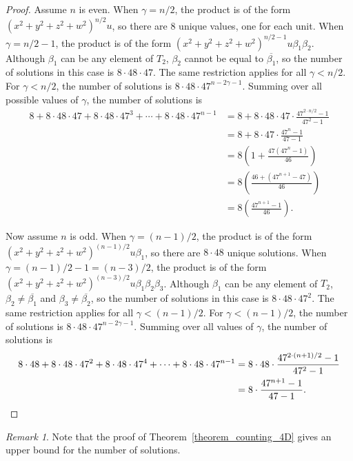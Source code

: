 \documentclass[12pt,table]{article}
\theoremstyle{definition}
\theoremstyle{remark}
\newtheorem{remark}[theorem]{Remark}
\newcommand{\myfrac}[2]{#1 / #2}
\numberwithin{equation}{section}
\begin{document}
\begin{proof}
Assume $ n $ is even.
When $ \gamma = \myfrac{n}{2} $, the product is of the form
$ (x^2 + y^2 + z^2 + w^2)^{\myfrac{n}{2}} u  $, so there are 8 unique values, one for
each unit.
When $ \gamma = \myfrac{n}{2} - 1 $, the product is of the form
$ (x^2 + y^2 + z^2 + w^2)^{\myfrac{n}{2} - 1} u \beta_1 \beta_2  $. Although $ \beta_1 $
can be any element of $ T_2 $, $ \beta_2 $ cannot be equal to $ \overline{ \beta_1 } $,
so the number of solutions in this case is $ 8 \cdot 48 \cdot 47 $. The same restriction
applies for all $ \gamma < \myfrac{n}{2} $. For $ \gamma < \myfrac{n}{2} $,
the number of
solutions is $ 8 \cdot 48 \cdot 47^{n - 2\gamma - 1} $.
Summing over all possible values of $ \gamma $, the number of solutions is
\begin{align*}
8 + 8 \cdot 48 \cdot 47 + 8 \cdot 48 \cdot 47^3 + \dotsb
+ 8 \cdot 48 \cdot 47^{n-1}
&= 8 + 8 \cdot 48 \cdot 47 \cdot \frac{47^{2 \cdot \myfrac{n}{2} } - 1 }{47^2 - 1}
\\
&= 8 + 8 \cdot 47 \cdot \frac{47^{n} - 1 }{47 - 1}
\\
&= 8 \left(1 +  \frac{47 (47^{n} - 1 ) }{46}\right)
\\
&= 8 \left( \frac{46 + (47^{n+1} - 47 ) }{46}\right)
\\
&= 8 \left( \frac{47^{n+1} -1 }{46}\right).
\end{align*}

Now assume $ n $ is odd.
When $ \gamma = \myfrac{(n-1)}{2} $, the product is of the form
$ (x^2 + y^2 + z^2 + w^2)^{\myfrac{(n-1)}{2}} u \beta_1  $, so there are $ 8 \cdot 48 $
unique solutions.
When $ \gamma = \myfrac{(n-1)}{2} - 1 = \myfrac{(n-3)}{2}  $, the product is of the form
$ (x^2 + y^2 + z^2 + w^2)^{\myfrac{(n-3)}{2}} u \beta_1 \beta_2 \beta_3  $. Although $ \beta_1 $
can be any element of $ T_2 $, $ \beta_2 \neq \overline{ \beta_1 } $
and $ \beta_3 \neq \overline{ \beta_2 } $,
so the number of solutions in this case is $ 8 \cdot 48 \cdot 47^2 $. The same restriction
applies for all $ \gamma < \myfrac{(n-1)}{2} $. For $ \gamma < \myfrac{(n-1)}{2} $,
the number of solutions is $ 8 \cdot 48 \cdot 47^{n - 2\gamma - 1 } $.
Summing over all values of $ \gamma $, the number of solutions is
\begin{align*}
8 \cdot 48 + 8 \cdot 48 \cdot 47^2 + 8 \cdot 48 \cdot 47^4 + \dotsb
+ 8 \cdot 48 \cdot 47^{n-1}
&= 8 \cdot 48 \cdot \frac{47^{2 \cdot \myfrac{(n+1)}{2} } - 1 }{47^2 - 1}
\\
&= 8  \cdot \frac{47^{n+1} - 1 }{47 - 1}. \qedhere
\end{align*}
\end{proof}
\begin{remark}
Note that the proof of Theorem~\ref{theorem_counting_4D}
gives an upper bound for the number of solutions.
\end{remark}
\end{document}
